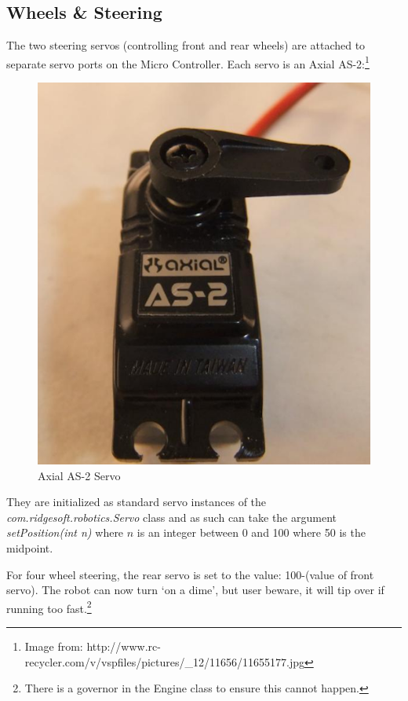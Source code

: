 \documentclass[12pt]{article}
\begin{document}
\clearpage
\subsection{Wheels \& Steering}
The two steering servos (controlling front and rear wheels) are attached to separate servo ports on the Micro Controller.  Each servo is an Axial AS-2:\footnote{Image from: http://www.rc-recycler.com/v/vspfiles/pictures/\_12/11656/11655177.jpg}
\begin{figure}[h]
\centerline{\includegraphics[scale=.75, angle=270]{img/as2}}
\caption{Axial AS-2 Servo}
\end{figure}

They are initialized as standard servo instances of the \textit{com.ridgesoft.robotics.Servo} class and as such can take the argument \textit{setPosition(int n)} where $n$ is an integer between 0 and 100 where 50 is the midpoint.

For four wheel steering, the rear servo is set to the value: 100-(value of front servo).  The robot can now turn `on a dime', but user beware, it will tip over if running too fast.\footnote{There is a governor in the Engine class to ensure this cannot happen.} 
\end{document}
